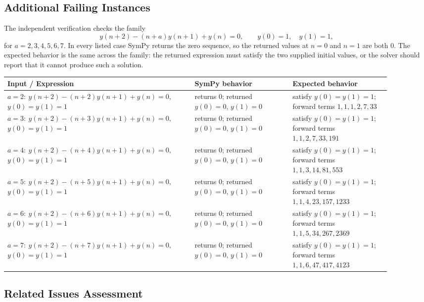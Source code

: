\documentclass[11pt]{article}
\begin{document}
\subsection{Additional Failing Instances}

The independent verification checks the family
\[
    y(n+2) - (n+a)y(n+1) + y(n) = 0,\qquad y(0)=1,\quad y(1)=1,
\]
for \(a=2,3,4,5,6,7\).  In every listed case SymPy returns the zero sequence,
so the returned values at \(n=0\) and \(n=1\) are both \(0\).  The expected
behavior is the same across the family: the returned expression must satisfy
the two supplied initial values, or the solver should report that it cannot
produce such a solution.

\begin{center}
\small
\renewcommand{\arraystretch}{1.3}
\begin{tabular}{@{}>{\raggedright\arraybackslash}p{0.44\linewidth}>{\raggedright\arraybackslash}p{0.23\linewidth}>{\raggedright\arraybackslash}p{0.23\linewidth}@{}}
\toprule
\textbf{Input / Expression} & \textbf{SymPy behavior} & \textbf{Expected behavior} \\
\midrule
\(a=2:\ y(n+2)-(n+2)y(n+1)+y(n)=0\), \(y(0)=y(1)=1\) & returns \(0\); returned \(y(0)=0\), \(y(1)=0\) & satisfy \(y(0)=y(1)=1\); forward terms \(1,1,1,2,7,33\) \\
\(a=3:\ y(n+2)-(n+3)y(n+1)+y(n)=0\), \(y(0)=y(1)=1\) & returns \(0\); returned \(y(0)=0\), \(y(1)=0\) & satisfy \(y(0)=y(1)=1\); forward terms \(1,1,2,7,33,191\) \\
\(a=4:\ y(n+2)-(n+4)y(n+1)+y(n)=0\), \(y(0)=y(1)=1\) & returns \(0\); returned \(y(0)=0\), \(y(1)=0\) & satisfy \(y(0)=y(1)=1\); forward terms \(1,1,3,14,81,553\) \\
\(a=5:\ y(n+2)-(n+5)y(n+1)+y(n)=0\), \(y(0)=y(1)=1\) & returns \(0\); returned \(y(0)=0\), \(y(1)=0\) & satisfy \(y(0)=y(1)=1\); forward terms \(1,1,4,23,157,1233\) \\
\(a=6:\ y(n+2)-(n+6)y(n+1)+y(n)=0\), \(y(0)=y(1)=1\) & returns \(0\); returned \(y(0)=0\), \(y(1)=0\) & satisfy \(y(0)=y(1)=1\); forward terms \(1,1,5,34,267,2369\) \\
\(a=7:\ y(n+2)-(n+7)y(n+1)+y(n)=0\), \(y(0)=y(1)=1\) & returns \(0\); returned \(y(0)=0\), \(y(1)=0\) & satisfy \(y(0)=y(1)=1\); forward terms \(1,1,6,47,417,4123\) \\
\bottomrule
\end{tabular}
\end{center}

\subsection{Related Issues Assessment}
\end{document}
